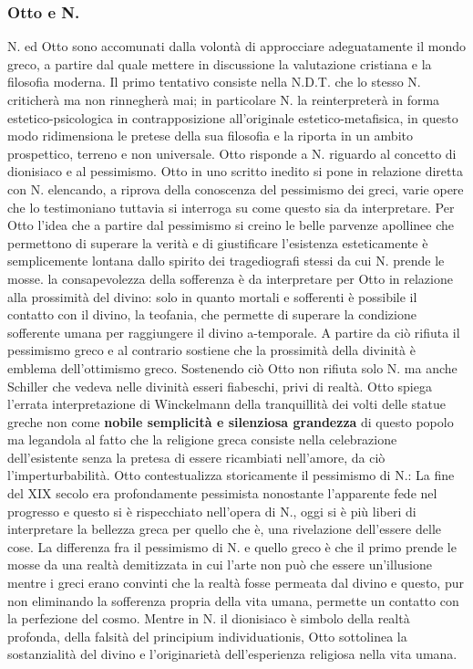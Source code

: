 \documentclass[10pt,a4paper]{article}
\begin{document}
\subsubsection{Otto e N.}
N. ed Otto sono accomunati dalla volontà di approcciare adeguatamente il mondo greco, a partire dal quale mettere in discussione la valutazione cristiana e la filosofia moderna. Il primo tentativo consiste nella N.D.T. che lo stesso N. criticherà ma non rinnegherà mai; in particolare N. la reinterpreterà in forma estetico-psicologica in contrapposizione all'originale estetico-metafisica, in questo modo ridimensiona le pretese della sua filosofia e la riporta in un ambito prospettico, terreno e non universale. Otto risponde a N. riguardo al concetto di dionisiaco e al pessimismo. Otto in uno scritto inedito si pone in relazione diretta con N. elencando, a riprova della conoscenza del pessimismo dei greci, varie opere che lo testimoniano tuttavia si interroga su come questo sia da interpretare. Per Otto l'idea che a partire dal pessimismo si creino le belle parvenze apollinee che permettono di superare la verità e di giustificare l'esistenza esteticamente è semplicemente lontana dallo spirito dei tragediografi stessi da cui N. prende le mosse. la consapevolezza della sofferenza è da interpretare per Otto in relazione alla prossimità del divino: solo in quanto mortali e sofferenti è possibile il contatto con il divino, la teofania, che permette di superare la condizione sofferente umana per raggiungere il divino a-temporale. A partire da ciò rifiuta il pessimismo greco e al contrario sostiene che la prossimità della divinità è emblema dell'ottimismo greco. Sostenendo ciò Otto non rifiuta solo N. ma anche Schiller che vedeva nelle divinità esseri fiabeschi, privi di realtà. Otto spiega l'errata interpretazione di Winckelmann della tranquillità dei volti delle statue greche non come \textbf{nobile semplicità e silenziosa grandezza} di questo popolo ma legandola al fatto che la religione greca consiste nella celebrazione dell'esistente senza la pretesa di essere ricambiati nell'amore, da ciò l'imperturbabilità. Otto contestualizza storicamente il pessimismo di N.: La fine del XIX secolo era profondamente pessimista nonostante l'apparente fede nel progresso e questo si è rispecchiato nell'opera di N., oggi si è più liberi di interpretare la bellezza greca per quello che è, una rivelazione dell'essere delle cose. La differenza fra il pessimismo di N. e quello greco è che il primo prende le mosse da una realtà demitizzata in cui l'arte non può che essere un'illusione mentre i greci erano convinti che la realtà fosse permeata dal divino e questo, pur non eliminando la sofferenza propria della vita umana, permette un contatto con la perfezione del cosmo. Mentre in N. il dionisiaco è simbolo della realtà profonda, della falsità del principium individuationis, Otto sottolinea la sostanzialità del divino e l'originarietà dell'esperienza religiosa nella vita umana.\\
\end{document}
